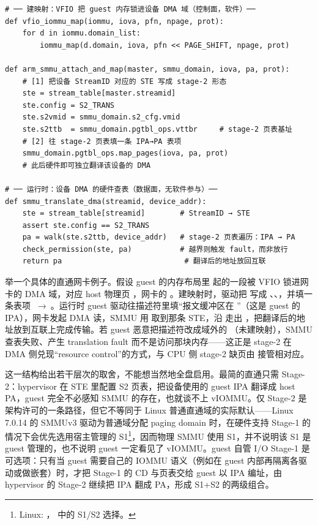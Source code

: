 \begin{lstlisting}[caption={SMMUv3 stage-2 的两段路径：建映射（软件）与运行时 DMA 查表（硬件）（依据 vfio\_iommu\_type1.c / arm-smmu-v3.c 整理的示意）},label={lst:smmu-path},style=pseudopy]
# ── 建映射：VFIO 把 guest 内存锁进设备 DMA 域（控制面，软件）──
def vfio_iommu_map(iommu, iova, pfn, npage, prot):
    for d in iommu.domain_list:
        iommu_map(d.domain, iova, pfn << PAGE_SHIFT, npage, prot)

def arm_smmu_attach_and_map(master, smmu_domain, iova, pa, prot):
    # [1] 把设备 StreamID 对应的 STE 写成 stage-2 形态
    ste = stream_table[master.streamid]
    ste.config = S2_TRANS
    ste.s2vmid = smmu_domain.s2_cfg.vmid
    ste.s2ttb  = smmu_domain.pgtbl_ops.vttbr     # stage-2 页表基址
    # [2] 往 stage-2 页表填一条 IPA→PA 表项
    smmu_domain.pgtbl_ops.map_pages(iova, pa, prot)
    # 此后硬件即可独立翻译该设备的 DMA

# ── 运行时：设备 DMA 的硬件查表（数据面，无软件参与）──
def smmu_translate_dma(streamid, device_addr):
    ste = stream_table[streamid]        # StreamID → STE
    assert ste.config == S2_TRANS
    pa = walk(ste.s2ttb, device_addr)   # stage-2 页表遍历：IPA → PA
    check_permission(ste, pa)           # 越界则触发 fault，而非放行
    return pa                            # 翻译后的地址放回互联
\end{lstlisting}

举一个具体的直通网卡例子。假设 guest 的内存布局里  起的一段被 VFIO 锁进网卡的 DMA 域，对应 host 物理页 ，网卡的 。建映射时，驱动把  写成 、、，并填一条表项 ~→~。运行时 guest 驱动往描述符里填“报文缓冲区在 ”（这是 guest 的 IPA），网卡发起 DMA 读，SMMU 用  取到那条 STE，沿  走出 ，把翻译后的地址放到互联上完成传输。若 guest 恶意把描述符改成域外的 （未建映射），SMMU 查表失败、产生 translation fault 而不是访问那块内存——这正是 stage-2 在 DMA 侧兑现“resource control”的方式，与 CPU 侧 stage-2 缺页由  接管相对应。

这一结构给出若干层次的取舍，不能想当然地全盘启用。最简的直通只需 Stage-2：hypervisor 在 STE 里配置 S2 页表，把设备使用的 guest IPA 翻译成 host PA，guest 完全不必感知 SMMU 的存在，也就谈不上 vIOMMU。仅 Stage-2 是架构许可的一条路径，但它不等同于 Linux 普通直通域的实际默认——Linux 7.0.14 的 SMMUv3 驱动为普通域分配 paging domain 时，在硬件支持 Stage-1 的情况下会优先选用宿主管理的 S1\footnote{Linux: ， 中的 S1/S2 选择。}，因而物理 SMMU 使用 S1，并不说明该 S1 是 guest 管理的，也不说明 guest 一定看见了 vIOMMU。guest 自管 I/O Stage-1 是可选项：只有当 guest 需要自己的 IOMMU 语义（例如在 guest 内部再隔离各驱动或做嵌套）时，才把 Stage-1 的 CD 与页表交给 guest 以 IPA 编址，由 hypervisor 的 Stage-2 继续把 IPA 翻成 PA，形成 S1+S2 的两级组合\cite{source10}。

